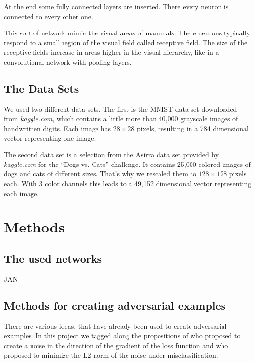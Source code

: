 \documentclass[%
 reprint,
 amsmath,amssymb,
 aps,
]{revtex4-1}
\begin{document}
At the end some fully connected layers are inserted. There every neuron is connected to every other one.

This sort of network mimic the visual areas of mammals. There neurons typically respond to a small region of the visual field called receptive field. The size of the receptive fields increase in areas higher in the visual hierarchy, like in a convolutional network with pooling layers.

\subsection{The Data Sets}

We used two different data sets. The first is the MNIST data set downloaded from \emph{kaggle.com}, which contains a little more than 40,000 grayscale images of handwritten digits. Each image has $28\times 28$ pixels, resulting in a 784 dimensional vector representing one image. 

The second data set is a selection from the Asirra data set provided by \emph{kaggle.com} for the ``Dogs vs. Cats'' challenge. It contains 25,000 colored images of dogs and cats of different sizes. That's why we rescaled them to $128\times 128$ pixels each. With 3 color channels this leads to a 49,152 dimensional vector representing each image. 
\section{Methods}

\subsection{The used networks}

JAN

\subsection{Methods for creating adversarial examples}

There are various ideas, that have already been used to create adversarial examples. In this project we tagged along the propositions of \citeauthor{paperGrad} who proposed to create a noise in the direction of the gradient of the loss function and \citeauthor{paperMinimize} who proposed to minimize the L2-norm of the noise under misclassification.
\end{document}
